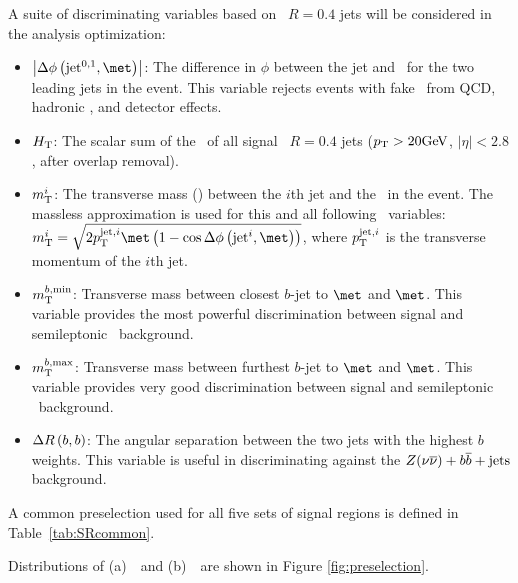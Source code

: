 A suite of discriminating variables based on \antikt\ $R=0.4$ jets will be considered in the analysis optimization: 
\begin{itemize}
	\item $\dphijettwomet$: The difference in $\phi$ between the jet and \met\ for the two leading jets in the event. This variable rejects events with fake \met\ from QCD, hadronic \ttbar, and detector effects.
	\item $H_{\mathrm{T}}$: The scalar sum of the \pt\ of all signal \antikt\ $R=0.4$ jets ($\pt>20\gev$, $|\eta|<2.8$, after overlap removal).
	\item $m_{\mathrm{T}}^{i}$: The transverse mass (\mt) between the $i$th jet and the \met\ in the event. The massless approximation is used for this and all following \mt\ variables:\newline $\mtjetimet = \sqrt{2\ptjeti\met\left(1-\cos{\Delta\phi\left(\mathrm{jet}^i,\met\right)}\right)}$, where $p_{\mathrm{T}}^{\mathrm{jet},i}$ is the transverse momentum of the $i$th jet.
	\item $m_{\mathrm{T}}^{b,\mathrm{min}}$: Transverse mass between closest $b$-jet to $\met$ and $\met$. This variable provides the most powerful discrimination between signal and semileptonic \ttbar\ background.
	\item $m_{\mathrm{T}}^{b,\mathrm{max}}$: Transverse mass between furthest $b$-jet to $\met$ and $\met$. This variable provides very good discrimination between signal and semileptonic \ttbar\ background.
	\item $\Delta R\left(b,b\right)$: The angular separation between the two jets with the highest $b$ weights. This variable is useful in discriminating against the $Z(\nu\overline\nu)+b\overline{b}+\rm{jets}$ background. %
\end{itemize}

A common preselection used for all five sets of signal regions is defined in Table~\ref{tab:SRcommon}.  %

Distributions of (a)~\mantikttwelvezero\ and (b)~\mtbmin\ are shown in Figure \ref{fig:preselection}.  


